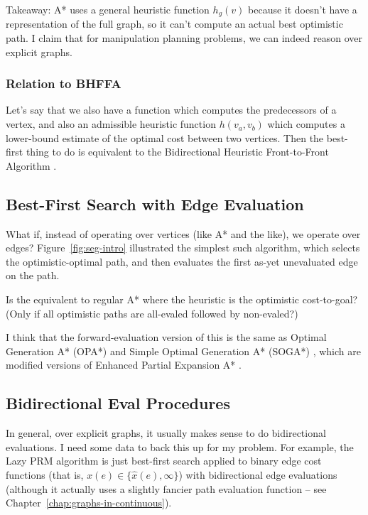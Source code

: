 Takeaway: A* uses a general heuristic function $h_g(v)$
because it doesn't have a representation of the full graph,
so it can't compute an actual best optimistic path.
I claim that for manipulation planning problems,
we can indeed reason over explicit graphs.

\subsubsection{Relation to BHFFA}

Let's say that we also have a function which computes the predecessors
of a vertex,
and also an admissible heuristic function $h(v_a,v_b)$ which computes
a lower-bound estimate of the optimal cost between two vertices.
Then the best-first thing to do is equivalent to the
Bidirectional Heuristic Front-to-Front Algorithm
\cite{champeauxsint1977bhffa}.

\subsection{Best-First Search with Edge Evaluation}

What if, instead of operating over vertices (like A* and the like),
we operate over edges?
Figure~\ref{fig:seg-intro} illustrated the simplest such algorithm,
which selects the optimistic-optimal path,
and then evaluates the first as-yet unevaluated edge on the path.

Is the equivalent to regular A*
where the heuristic is the optimistic cost-to-goal?
(Only if all optimistic paths are all-evaled followed by non-evaled?)

I think that the forward-evaluation version of this is the same as
Optimal Generation A* (OPA*) and Simple Optimal Generation A* (SOGA*)
\cite{goldenberg2013epeastar},
which are modified versions of
Enhanced Partial Expansion A* \cite{felner2012epastar}.

\subsection{Bidirectional {\sc Eval} Procedures}

In general, over explicit graphs,
it usually makes sense to do bidirectional evaluations.
I need some data to back this up for my problem.
For example,
the Lazy PRM algorithm \cite{bohlin2000lazyprm}
is just best-first search
applied to binary edge cost functions
(that is, $x(e) \in \{ \hat{x}(e), \infty \}$)
with bidirectional edge evaluations
(although it actually uses a slightly fancier path evaluation function
-- see Chapter~\ref{chap:graphs-in-continuous}).


